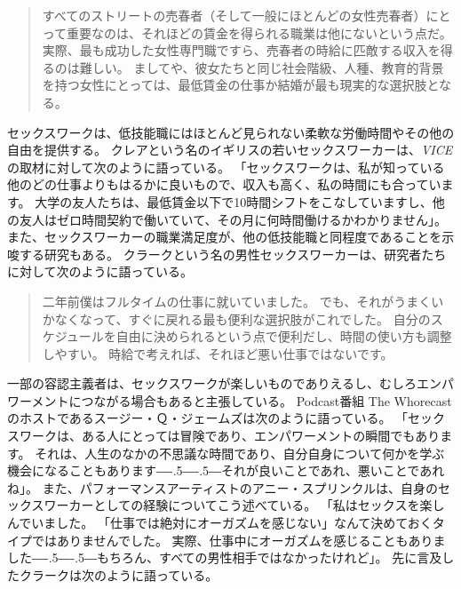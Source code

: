 \documentclass[paper=a4,book,openany]{jlreq}
\newcommand{\ig}[1]{}           %
\def\DDASH{―\kern-.5\zw―\kern-.5\zw―} %
\begin{document}
\begin{quote}
すべてのストリートの売春者（そして一般にほとんどの女性売春者）にとって重要なのは、それほどの賃金を得られる職業は他にないという点だ。
実際、最も成功した女性専門職ですら、売春者の時給に匹敵する収入を得るのは難しい。
ましてや、彼女たちと同じ社会階級、人種、教育的背景を持つ女性にとっては、最低賃金の仕事か結婚が最も現実的な選択肢となる。
\citep[p.104]{bernstein99:_whats_wrong_prost}\ig{Elizabeth Bernstein}
\end{quote}

セックスワークは、低技能職にはほとんど見られない柔軟な労働時間やその他の自由を提供する。
クレアという名のイギリスの若いセックスワーカーは、\emph{VICE}の取材に対して次のように語っている。
「セックスワークは、私が知っている他のどの仕事よりもはるかに良いもので、収入も高く、私の時間にも合っています。
大学の友人たちは、最低賃金以下で10時間シフトをこなしていますし、他の友人はゼロ時間契約で働いていて、その月に何時間働けるかわかりません」\citep{mcintyre15:_what_its_like_pay_your}。
また、セックスワーカーの職業満足度が、他の低技能職と同程度であることを示唆する研究もある\citep{bilardi11:_job_satis_femal_sex_worker}。
クラークという名の男性セックスワーカーは、研究者たちに対して次のように語っている。

\begin{quote}
二年前僕はフルタイムの仕事に就いていました。
でも、それがうまくいかなくなって、すぐに戻れる最も便利な選択肢がこれでした。
自分のスケジュールを自由に決められるという点で便利だし、時間の使い方も調整しやすい。
時給で考えれば、それほど悪い仕事ではないです。
\citep[p.11]{curtis19:_we_are_naked_waitr_who_deliv_sex}
\end{quote}

一部の容認主義者は、セックスワークが楽しいものでありえるし、むしろエンパワーメントにつながる場合もあると主張している。
Podcast番組 The Whorecast のホストであるスージー・Ｑ・ジェームズは次のように語っている。
「セックスワークは、ある人にとっては冒険であり、エンパワーメントの瞬間でもあります。
それは、人生のなかの不思議な時間であり、自分自身について何かを学ぶ機会になることもあります{\DDASH}それが良いことであれ、悪いことであれね」\citep{richardson14:_is_sex_work_empow_enslav}。
また、パフォーマンスアーティストのアニー・スプリンクルは、自身のセックスワーカーとしての経験についてこう述べている。
「私はセックスを楽しんでいました。
「仕事では絶対にオーガズムを感じない」なんて決めておくタイプではありませんでした。
実際、仕事中にオーガズムを感じることもありました{\DDASH}もちろん、すべての男性相手ではなかったけれど」\citep[pp.42-43]{bell95:_whore_carniv}。
先に言及したクラークは次のように語っている。
\end{document}
